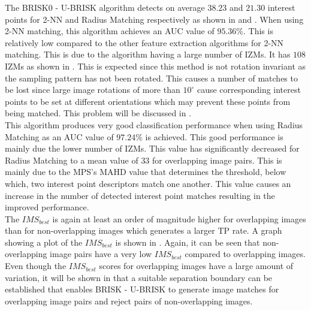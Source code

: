 The BRISK0 - U-BRISK algorithm detects on average $38.23$ and $21.30$ interest points for 2-NN and Radius Matching respectively as shown in  and . When using 2-NN matching, this algorithm achieves an AUC value of $95.36\%$. This is relatively low compared to the other feature extraction algorithms for 2-NN matching. This is due to the algorithm having a large number of IZMs. It has $108$ IZMs as shown in . This is expected since this method is not rotation invariant as the sampling pattern has not been rotated. This causes a number of matches to be lost since large image rotations of more than $10^{\circ}$ \citep{Leutenegger2011} cause corresponding interest points to be set at different orientations which may prevent these points from being matched. This problem will be discussed in .\\

This algorithm produces very good classification performance when using Radius Matching as an AUC value of $97.24\%$ is achieved. This good performance is mainly due the lower number of IZMs. This value has significantly decreased for Radius Matching to a mean value of $33$ for overlapping image pairs. This is mainly due to the MPS's MAHD value that determines the threshold, below which, two interest point descriptors match one another. This value causes an increase in the number of detected interest point matches resulting in the improved performance.\\

The $IMS_{best}$ is again at least an order of magnitude higher for overlapping images than for non-overlapping images which generates a larger TP rate. A graph showing a plot of the $IMS_{best}$ is shown in . Again, it can be seen that non-overlapping image pairs have a very low $IMS_{best}$ compared to overlapping images. Even though the $IMS_{best}$ scores for overlapping images have a large amount of variation, it will be shown in  that a suitable separation boundary can be established that enables BRISK - U-BRISK to generate image matches for overlapping image pairs and reject pairs of non-overlapping images.\\

